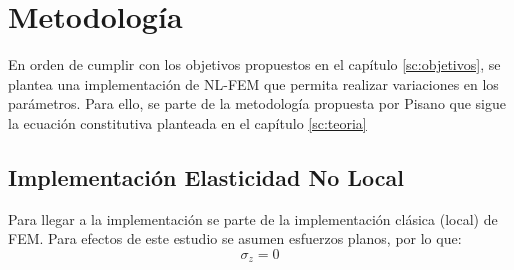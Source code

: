 \section{Metodología}
\label{sc:metodos}
	En orden de cumplir con los objetivos propuestos en el capítulo \ref{sc:objetivos}, se plantea una implementación de NL-FEM que permita realizar variaciones en los parámetros. Para ello, se parte de la metodología propuesta por Pisano \parencite{Pisano2009} que sigue la ecuación constitutiva planteada en el capítulo \ref{sc:teoria}
	\subsection{Implementación Elasticidad No Local}
	\label{sub:implementación}
	Para llegar a la implementación se parte de la implementación clásica (local) de FEM. Para efectos de este estudio se asumen esfuerzos planos, por lo que:
	\begin{equation}
		\sigma_z=0
	\end{equation}
